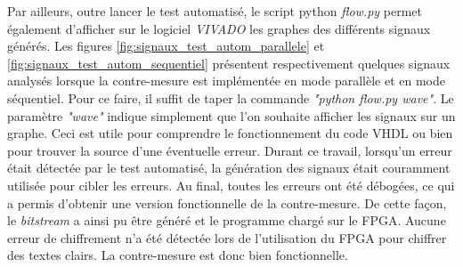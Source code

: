 \documentclass[oneside]{book}
\begin{document}
Par ailleurs, outre lancer le test automatisé, le script python \textit{flow.py} permet également d'afficher sur le logiciel \textit{VIVADO} les graphes des différents signaux générés. Les figures  \ref{fig:signaux_test_autom_parallele} et \ref{fig:signaux_test_autom_sequentiel} présentent respectivement quelques signaux analysés lorsque la contre-mesure est implémentée en mode parallèle et en mode séquentiel. Pour ce faire, il suffit de taper la commande \textit{"python flow.py wave"}. Le paramètre \textit{"wave"} indique simplement que l'on souhaite afficher les signaux sur un graphe. Ceci est utile pour comprendre le fonctionnement du code VHDL ou bien pour trouver la source d'une éventuelle erreur. Durant ce travail, lorsqu'un erreur était détectée par le test automatisé, la génération des signaux était couramment utilisée pour cibler les erreurs. Au final, toutes les erreurs ont été débogées, ce qui a permis d'obtenir une version fonctionnelle de la contre-mesure. De cette façon, le \textit{bitstream} a ainsi pu être généré et le programme chargé sur le FPGA. Aucune erreur de chiffrement n'a été détectée lors de l'utilisation du FPGA pour chiffrer des textes clairs. La contre-mesure est donc bien fonctionnelle.
\end{document}
